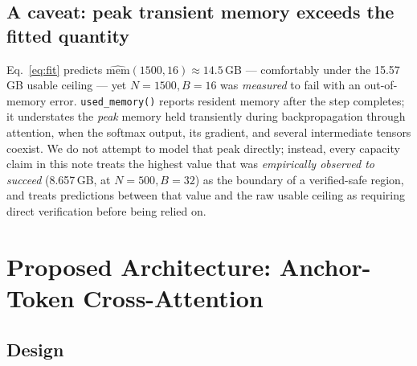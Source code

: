 \documentclass[11pt]{article}
\newcommand{\code}[1]{\texttt{#1}}
\begin{document}
\subsection{A caveat: peak transient memory exceeds the fitted quantity}
\label{sec:caveat}

Eq.~\eqref{eq:fit} predicts $\widehat{\mathrm{mem}}(1500,16)\approx14.5$\,GB
--- comfortably under the 15.57\,GB usable ceiling --- yet $N{=}1500,B{=}16$
was \emph{measured} to fail with an out-of-memory error. \code{used\_memory()}
reports resident memory after the step completes; it understates the
\emph{peak} memory held transiently during backpropagation through
attention, when the softmax output, its gradient, and several intermediate
tensors coexist. We do not attempt to model that peak directly; instead,
every capacity claim in this note treats the highest value that was
\emph{empirically observed to succeed} (8.657\,GB, at $N{=}500,B{=}32$) as
the boundary of a verified-safe region, and treats predictions between that
value and the raw usable ceiling as requiring direct verification before
being relied on.

\section{Proposed Architecture: Anchor-Token Cross-Attention}
\label{sec:proposed}

\subsection{Design}
\end{document}
